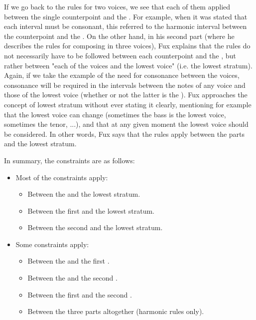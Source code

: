 If we go back to the rules for two voices, we see that each of them applied between the single counterpoint and the \cf. For example, when it was stated that each interval must be consonant, this referred to the harmonic interval between the counterpoint and the \cf.
On the other hand, in his second part (where he describes the rules for composing in three voices), Fux explains that the rules do not necessarily have to be followed between each counterpoint and the \cf, but rather between "each of the voices and the lowest voice" (i.e. the lowest stratum). Again, if we take the example of the need for consonance between the voices, consonance will be required in the intervals between the notes of any voice and those of the lowest voice (whether or not the latter is the \cf).
Fux approaches the concept of lowest stratum without ever stating it clearly, mentioning for example that the lowest voice can change (sometimes the bass is the lowest voice, sometimes the tenor, ...), and that at any given moment the lowest voice should be considered. In other words, Fux says that the rules apply between the parts and the lowest stratum.

In summary, the constraints are as follows:
\begin{itemize}
    \item Most of the constraints apply:
    \begin{itemize}
        \item Between the \cfs and the lowest stratum.
        \item Between the first \cps and the lowest stratum.
        \item Between the second \cps and the lowest stratum.
    \end{itemize}
    \item Some constraints apply:
    \begin{itemize}
        \item Between the \cfs and the first \cp.
        \item Between the \cfs and the second \cp.
        \item Between the first \cps and the second \cp.
        \item Between the three parts altogether (harmonic rules only).
    \end{itemize}

\end{itemize}


